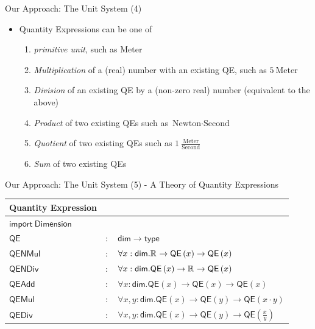 \documentclass{beamer}
\newcommand{\realnz}{\mathbb{R}^{\*}}
\begin{document}
  \begin{frame}{Our Approach: The Unit System (4)}
    \begin{itemize}[<+->]
      \item Quantity Expressions can be one of
      \begin{enumerate}
        \item \textit{primitive unit}, such as Meter

        \item \textit{Multiplication} of a (real) number with an existing QE, such as $5\ \text{Meter}$
        \item \textit{Division} of an existing QE by a (non-zero real) number (equivalent to the above)

        \item \textit{Product} of two existing QEs such as $\text{Newton} \cdot{} \text{Second}$
        \item \textit{Quotient} of two existing QEs such as $1\ \frac{\text{Meter}}{\text{Second}}$

        \item \textit{Sum} of two existing QEs
      \end{enumerate}
    \end{itemize}
  \end{frame}

  \begin{frame}{Our Approach: The Unit System (5) - A Theory of Quantity Expressions}
    \begin{center}
      \begin{tabular}{|l l l|}
        \hline
        \textsf{Quantity Expression} & &\\\hline
        $ \mathsf{import \ Dimension}$ &&\\\hline
        $\mathsf{QE}$ & $:$ & $ \mathsf{dim} \rightarrow \mathsf{type}$\\
        $\mathsf{QENMul}$& $:$ & $ \forall x : \mathsf{dim} . \realnz \rightarrow \mathsf{QE}\left( x\right) \rightarrow \mathsf{QE}\left( x\right)$\\
        $\mathsf{QENDiv}$& $:$ & $ \forall x : \mathsf{dim} . \mathsf{QE}\left( x\right) \rightarrow \realnz \rightarrow \mathsf{QE}\left( x\right)$\\

        $\mathsf{QEAdd}$& $:$ & $ \forall x : \mathsf{dim} . \mathsf{QE}\left( x\right) \rightarrow \mathsf{QE}\left( x\right) \rightarrow \mathsf{QE} \left( x \right)  $\\
        $\mathsf{QEMul}$& $:$ & $ \forall x, y : \mathsf{dim} . \mathsf{QE}\left( x\right) \rightarrow \mathsf{QE}\left( y\right) \rightarrow \mathsf{QE} \left( x \cdot{} y \right)  $\\
        $ \mathsf{QEDiv}$& $:$ & $ \forall x, y : \mathsf{dim} . \mathsf{QE}\left( x\right) \rightarrow \mathsf{QE}\left( y\right) \rightarrow \mathsf{QE} \left( \frac{x}{y} \right)  $\\\hline
      \end{tabular}
    \end{center}
  \end{frame}
\end{document}
